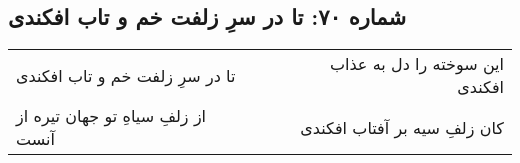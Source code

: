 \begin{center}
\section*{شماره ۷۰: تا در سرِ زلفت خم و تاب افکندی}
\label{sec:070}
\begin{longtable}{l p{0.5cm} r}
تا در سرِ زلفت خم و تاب افکندی
&&
این سوخته را دل به عذاب افکندی
\\
از زلفِ سیاهِ تو جهان تیره از آنست
&&
کان زلفِ سیه بر آفتاب افکندی
\\
\end{longtable}
\end{center}
